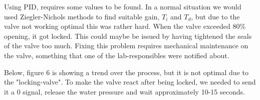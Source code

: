 Using PID, requires some values to be found. In a normal situation we would used Ziegler-Nichols methods to find suitable gain, $T_i$ and $T_d$, but due to the valve not working optimal this was rather hard. When the valve exceeded 80$\%$ opening, it got locked. This could maybe be issued by having tightened the seals of the valve too much. Fixing this problem requires mechanical maintenance on the valve, something that one of the lab-responsibles were notified about.

Below, figure 6 is showing a trend over the process, but it is not optimal due to the "locking-valve". To make the valve react after being locked, we needed to send it a 0 signal, release the water pressure and wait approximately 10-15 seconds.


